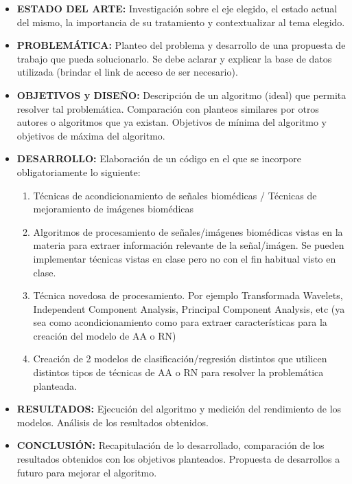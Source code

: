 \documentclass[10pt]{article}
\begin{document}
\begin{itemize}

    \item \textbf{ESTADO DEL ARTE:} Investigación sobre el eje elegido, el estado actual del mismo, la importancia de su tratamiento y contextualizar al tema elegido.
    
    \item \textbf{PROBLEMÁTICA:} Planteo del problema y desarrollo de una propuesta de trabajo que pueda solucionarlo. Se debe aclarar y explicar la base de datos utilizada (brindar el link de acceso de ser necesario).
    
    \item \textbf{OBJETIVOS y DISEÑO:} Descripción de un algoritmo (ideal) que permita resolver tal problemática. Comparación con planteos similares por otros autores o algoritmos que ya existan. Objetivos de mínima del algoritmo y objetivos de máxima del algoritmo.
    
    \item \textbf{DESARROLLO:} Elaboración de un código en el que se incorpore obligatoriamente lo siguiente:
    
        \begin{enumerate}
            \item Técnicas de acondicionamiento de señales biomédicas / Técnicas de mejoramiento de imágenes biomédicas
    
            \item Algoritmos de procesamiento de señales/imágenes biomédicas vistas en la materia para extraer información relevante de la señal/imágen. Se pueden implementar técnicas vistas en clase pero no con el fin habitual visto en clase.
    
            \item Técnica novedosa de procesamiento. Por ejemplo Transformada Wavelets, Independent Component Analysis, Principal Component Analysis, etc (ya sea como acondicionamiento como para extraer características para la creación del modelo de AA o RN)
    
            \item Creación de 2 modelos de clasificación/regresión distintos que utilicen distintos tipos de técnicas de AA o RN para resolver la problemática planteada.
        \end{enumerate}
    
    \item \textbf{RESULTADOS:} Ejecución del algoritmo y medición del rendimiento de los modelos. Análisis de los resultados obtenidos.
    
    \item \textbf{CONCLUSIÓN:} Recapitulación de lo desarrollado, comparación de los resultados obtenidos con los objetivos planteados. Propuesta de desarrollos a futuro para mejorar el algoritmo.
    
\end{itemize}
\end{document}
